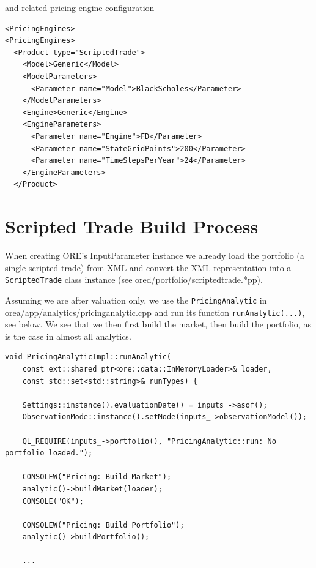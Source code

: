 \documentclass[12pt, a4paper]{report}
\begin{document}
and related pricing engine configuration

\begin{verbatim}
<PricingEngines>
<PricingEngines>
  <Product type="ScriptedTrade">
    <Model>Generic</Model>
    <ModelParameters>
      <Parameter name="Model">BlackScholes</Parameter>
    </ModelParameters>
    <Engine>Generic</Engine>
    <EngineParameters>
      <Parameter name="Engine">FD</Parameter>
      <Parameter name="StateGridPoints">200</Parameter>
      <Parameter name="TimeStepsPerYear">24</Parameter>
    </EngineParameters>
  </Product>
\end{verbatim}

\section{Scripted Trade Build Process}

When creating ORE's InputParameter instance we already load the portfolio (a single
scripted trade) from XML and convert the XML representation into a {\tt ScriptedTrade}
class instance (see ored/portfolio/scriptedtrade.*pp). 

Assuming we are after valuation only, we use the {\tt PricingAnalytic} in
orea/app/analytics/pricinganalytic.cpp and run its function {\tt runAnalytic(...)}, see below.
We see that we then first build the market, then build the portfolio, as is the case in almost
all analytics.

\begin{verbatim}
void PricingAnalyticImpl::runAnalytic( 
    const ext::shared_ptr<ore::data::InMemoryLoader>& loader, 
    const std::set<std::string>& runTypes) {

    Settings::instance().evaluationDate() = inputs_->asof();
    ObservationMode::instance().setMode(inputs_->observationModel());

    QL_REQUIRE(inputs_->portfolio(), "PricingAnalytic::run: No portfolio loaded.");

    CONSOLEW("Pricing: Build Market");
    analytic()->buildMarket(loader);
    CONSOLE("OK");

    CONSOLEW("Pricing: Build Portfolio");
    analytic()->buildPortfolio();

    ...
\end{verbatim}
\end{document}
